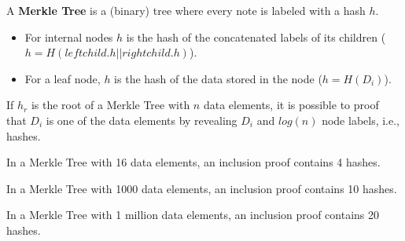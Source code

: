 \begin{definition}
	A \textbf{Merkle Tree} is a (binary) tree where every note is labeled with a hash $h$.
	\begin{itemize}
		\item For internal nodes $h$ is the hash of the concatenated labels of its children ($h=H(\mathit{leftchild}.h||\mathit{rightchild}.h)$).
		\item For a leaf node, $h$ is the hash of the data stored in the node ($h=H(D_i)$).
	\end{itemize}
\end{definition}

\begin{lem}
If $h_r$ is the root of a Merkle Tree with $n$ data elements, it is possible to proof that $D_i$ is one of the data elements by revealing $D_i$ and $log(n)$ node labels, i.e., hashes.
\end{lem}

\begin{example}
	In a Merkle Tree with 16 data elements, an inclusion proof contains 4 hashes.
	
	In a Merkle Tree with 1000 data elements, an inclusion proof contains 10 hashes.
	
	In a Merkle Tree with 1 million data elements, an inclusion proof contains 20 hashes.
\end{example}

